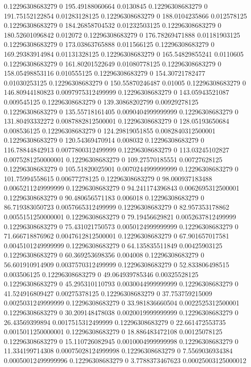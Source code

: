 0.12296308683279 0 195.49188060664 0.0130845
0.12296308683279 0 191.75152122854 0.01283128125
0.12296308683279 0 188.0104235866 0.012578125
0.12296308683279 0 184.26858704532 0.01232503125
0.12296308683279 0 180.52601096842 0.012072
0.12296308683279 0 176.78269471888 0.01181903125
0.12296308683279 0 173.03863765888 0.011566125
0.12296308683279 0 169.29383914984 0.01131328125
0.12296308683279 0 165.54829855241 0.0110605
0.12296308683279 0 161.80201522649 0.01080778125
0.12296308683279 0 158.05498853116 0.010555125
0.12296308683279 0 154.30721782477 0.01030253125
0.12296308683279 0 150.55870246487 0.01005
0.12296308683279 0 146.80944180823 0.0097975312499999
0.12296308683279 0 143.05943521087 0.009545125
0.12296308683279 0 139.30868202799 0.00929278125
0.12296308683279 0 135.55718161405 0.0090404999999999
0.12296308683279 0 131.80493332272 0.0087882812500001
0.12296308683279 0 128.05193650684 0.008536125
0.12296308683279 0 124.29819051855 0.0082840312500001
0.12296308683279 0 120.54369470914 0.008032
0.12296308683279 0 116.78844842913 0.0077800312499999
0.12296308683279 0 113.03245102827 0.0075281250000001
0.12296308683279 0 109.27570185551 0.00727628125
0.12296308683279 0 105.51820025901 0.0070244999999999
0.12296308683279 0 101.75994558615 0.00677278125
0.12296308683279 0 98.000937183488 0.0065211249999999
0.12296308683279 0 94.241174396843 0.0062695312500001
0.12296308683279 0 90.480656571183 0.006018
0.12296308683279 0 86.719383050723 0.0057665312499999
0.12296308683279 0 82.957353178862 0.0055151250000001
0.12296308683279 0 79.19456629821 0.0052637812499999
0.12296308683279 0 75.431021750573 0.0050124999999999
0.12296308683279 0 71.666718876962 0.0047612812500001
0.12296308683279 0 67.901657017581 0.0045101249999999
0.12296308683279 0 64.135835511849 0.00425903125
0.12296308683279 0 60.369253698356 0.004008
0.12296308683279 0 56.601910914909 0.0037570312499999
0.12296308683279 0 52.833806498515 0.003506125
0.12296308683279 0 49.064939785346 0.00325528125
0.12296308683279 0 45.295310110793 0.0030044999999999
0.12296308683279 0 41.524916809427 0.00275378125
0.12296308683279 0 37.753759215009 0.0025031249999999
0.12296308683279 0 33.981836660504 0.0022525312500001
0.12296308683279 0 30.209148478038 0.0020019999999999
0.12296308683279 0 26.43569399894 0.0017515312499999
0.12296308683279 0 22.661472553735 0.0015011250000001
0.12296308683279 0 18.886483472108 0.00125078125
0.12296308683279 0 15.110726082945 0.0010004999999998
0.12296308683279 0 11.334199714308 0.00075028124999998
0.12296308683279 0 7.5569036934384 0.00050012499999996
0.12296308683279 0 3.7788373467623 0.00025003125000012
